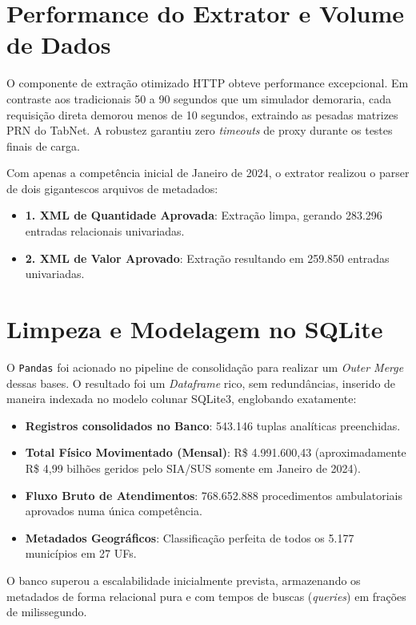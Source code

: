 \documentclass[
    12pt,
    oneside,
    a4paper,
    chapter=TITLE,
    section=TITLE
]{abntex2}
\begin{document}
\section{Performance do Extrator e Volume de Dados}

O componente de extração otimizado HTTP obteve performance excepcional. Em contraste aos tradicionais 50 a 90 segundos que um simulador demoraria, cada requisição direta demorou menos de 10 segundos, extraindo as pesadas matrizes PRN do TabNet. A robustez garantiu zero \textit{timeouts} de proxy durante os testes finais de carga.

Com apenas a competência inicial de Janeiro de 2024, o extrator realizou o parser de dois gigantescos arquivos de metadados:
\begin{itemize}
    \item \textbf{1. XML de Quantidade Aprovada}: Extração limpa, gerando 283.296 entradas relacionais univariadas.
    \item \textbf{2. XML de Valor Aprovado}: Extração resultando em 259.850 entradas univariadas.
\end{itemize}

\section{Limpeza e Modelagem no SQLite}

O \texttt{Pandas} foi acionado no pipeline de consolidação para realizar um \textit{Outer Merge} dessas bases. O resultado foi um \textit{Dataframe} rico, sem redundâncias, inserido de maneira indexada no modelo colunar SQLite3, englobando exatamente:
\begin{itemize}
    \item \textbf{Registros consolidados no Banco}: 543.146 tuplas analíticas preenchidas.
    \item \textbf{Total Físico Movimentado (Mensal)}: R\$ 4.991.600,43 (aproximadamente R\$ 4,99 bilhões geridos pelo SIA/SUS somente em Janeiro de 2024).
    \item \textbf{Fluxo Bruto de Atendimentos}: 768.652.888 procedimentos ambulatoriais aprovados numa única competência.
    \item \textbf{Metadados Geográficos}: Classificação perfeita de todos os 5.177 municípios em 27 UFs.
\end{itemize}

O banco superou a escalabilidade inicialmente prevista, armazenando os metadados de forma relacional pura e com tempos de buscas (\textit{queries}) em frações de milissegundo.
\end{document}
